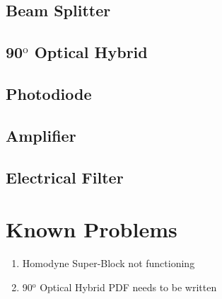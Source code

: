\documentclass[a4paper]{article}
\begin{document}
\subsection{Beam Splitter}


\subsection{90$^\text{o}$ Optical Hybrid}

\subsection{Photodiode}


\subsection{Amplifier}


\subsection{Electrical Filter}


\section{Known Problems}
\begin{enumerate}
    \item Homodyne Super-Block not functioning
    \item 90$^\text{o}$ Optical Hybrid PDF needs to be written
\end{enumerate}




\end{document}
